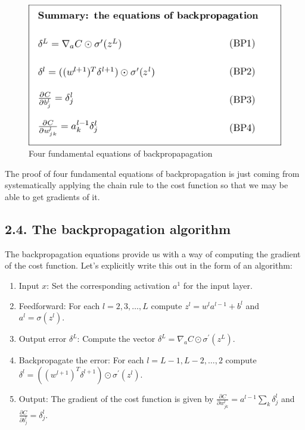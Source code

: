 \documentclass[12 pt]{article}
\begin{document}
\begin{figure}[htp]
\centering
\includegraphics{./figs/tikz21.png}
\caption{Four fundamental equations of backpropapagation}
\end{figure}

The proof of four fundamental equations of backpropagation is just
coming from systematically applying the chain rule to the cost function
so that we may be able to get gradients of it.

\subsection{2.4. The backpropagation algorithm}
\label{the-backpropagation-algorithm}

The backpropagation equations provide us with a way of computing the
gradient of the cost function. Let's explicitly write this out in the
form of an algorithm:

\begin{enumerate}
\def\labelenumi{\arabic{enumi}.}
\item
  Input $ x $: Set the corresponding activation $ a^1 $ for the
  input layer.
\item
  Feedforward: For each $ l = 2, 3, \ldots{}, L $ compute $ z^l =
  w^l a^{l - 1} + b^l $ and $ a^l = \sigma (z^l) $.
\item
  Output error $ \delta^L $: Compute the vector $ \delta^L =
  \nabla_a C \odot \sigma^{\prime} (z^L) $.
\item
  Backpropagate the error: For each $ l = L - 1, L - 2, \ldots{}, 2 $
  compute $ \delta^l = ((w^{l + 1})^T \delta^{l +
  1}) \odot \sigma^{\prime} (z^l) $.
\item
  Output: The gradient of the cost function is given by
  $ \frac{\partial C}{\partial w^l_{jk}} = a^{l - 1}\sum_k
  \delta^l_j $ and $ \frac{\partial C}{\partial b^l_j} =
  \delta^l_j $.
\end{enumerate}
\end{document}
